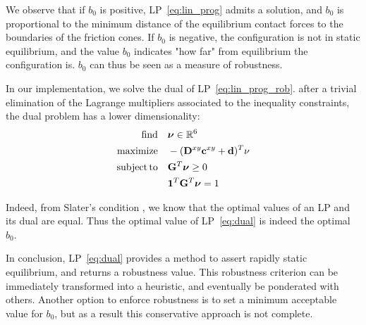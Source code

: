 We observe that if $b_0$ is positive, LP~\ref{eq:lin_prog} admits a solution, and $b_0$ is proportional to the minimum distance of the equilibrium contact forces to the boundaries of the friction cones.
If $b_0$ is negative, the configuration is not in static equilibrium, and the value $b_0$ indicates "how far" from equilibrium
the configuration is. $b_0$ can thus be seen as a measure of robustness.

In our implementation, we solve the dual of LP~\ref{eq:lin_prog_rob}.
after a trivial elimination of the Lagrange multipliers associated to the inequality constraints, the dual problem has a lower dimensionality:
\begin{equation} \label{eq:dual} \begin{aligned}
\find \quad & \bm{\nu} \in \Rv{6}\\
\maximize  \quad & -(\mathbf{D}^{xy} \mathbf{c}^{xy} + \mathbf{d})^T \nu \\
\st \quad &\mathbf{G}^T \bm{\nu} \ge 0 \\
& \mathbf{1}^T \mathbf{G}^T \bm{\nu} = 1 \\
\end{aligned} \end{equation}

Indeed, from Slater's condition \citep{Boyd:2004:CO:993483}, we know that the optimal values of an LP and its dual are equal. Thus the optimal value of LP~\ref{eq:dual} is indeed the optimal $b_0$.

In conclusion, LP~\ref{eq:dual} provides a method to assert rapidly static equilibrium, and returns a robustness value.
This robustness criterion can be immediately transformed into a heuristic, and eventually be ponderated with others.
Another option to enforce robustness is to set a minimum acceptable value for $b_0$, but as a result this conservative approach is not complete.
